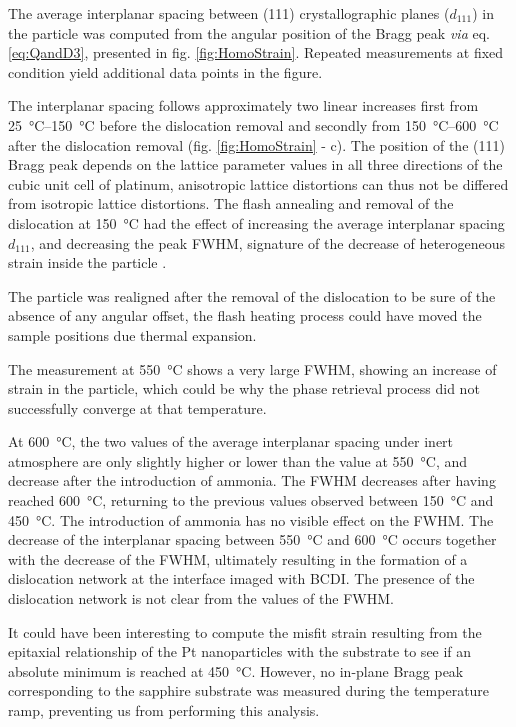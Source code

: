 {The average interplanar spacing between (111) crystallographic planes ($d_{111}$) in the particle was computed from the angular position of the Bragg peak \textit{via} eq. \ref{eq:QandD3}, presented in fig. \ref{fig:HomoStrain}.
Repeated measurements at fixed condition yield additional data points in the figure.

The interplanar spacing follows approximately two linear increases first from \qtyrange{25}{150}{\degreeCelsius} before the dislocation removal and secondly from \qtyrange{150}{600}{\degreeCelsius} after the dislocation removal (fig. \ref{fig:HomoStrain} - c).
The position of the (111) Bragg peak depends on the lattice parameter values in all three directions of the cubic unit cell of platinum, anisotropic lattice distortions can thus not be differed from isotropic lattice distortions.
The flash annealing and removal of the dislocation at \qty{150}{\degreeCelsius} had the effect of increasing the average interplanar spacing $d_{111}$, and decreasing the peak FWHM, signature of the decrease of heterogeneous strain inside the particle \parencite{Warren1990}.

The particle was realigned after the removal of the dislocation to be sure of the absence of any angular offset, the flash heating process could have moved the sample positions due thermal expansion.

The measurement at \qty{550}{\degreeCelsius} shows a very large FWHM, showing an increase of strain in the particle, which could be why the phase retrieval process did not successfully converge at that temperature.

At \qty{600}{\degreeCelsius}, the two values of the average interplanar spacing under inert atmosphere are only slightly higher or lower than the value at \qty{550}{\degreeCelsius}, and decrease after the introduction of ammonia.
The FWHM decreases after having reached \qty{600}{\degreeCelsius}, returning to the previous values observed between \qty{150}{\degreeCelsius} and \qty{450}{\degreeCelsius}.
The introduction of ammonia has no visible effect on the FWHM.
The decrease of the interplanar spacing between \qty{550}{\degreeCelsius} and \qty{600}{\degreeCelsius} occurs together with the decrease of the FWHM, ultimately resulting in the formation of a dislocation network at the interface imaged with BCDI.
The presence of the dislocation network is not clear from the values of the FWHM.

It could have been interesting to compute the misfit strain resulting from the epitaxial relationship of the Pt nanoparticles with the substrate to see if an absolute minimum is reached at \qty{450}{\degreeCelsius}.
However, no in-plane Bragg peak corresponding to the sapphire substrate was measured during the temperature ramp, preventing us from performing this analysis.

}
